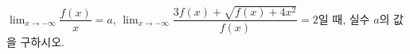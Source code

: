 $\displaystyle\lim_{x\to-\infty}\dfrac{f(x)}{x}=a$, $\displaystyle\lim_{x\to-\infty}\dfrac{3f(x)+\sqrt{f(x)+4x^2}}{f(x)}=2$일 때, 실수 $a$의 값을 구하시오.

